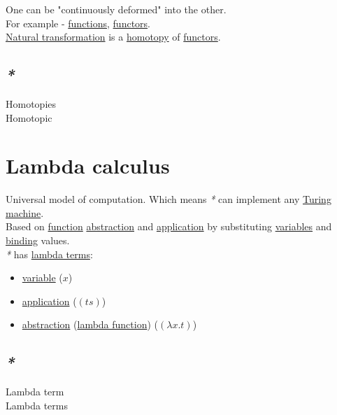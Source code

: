 \documentclass[a4paper,14pt,oneside]{book}
\begin{document}
One can be "continuously deformed" into the other.\\

For example - \hyperref[org97ed87c]{functions}, \hyperref[orgf720a64]{functors}.\\
\hyperref[orgffb05cd]{Natural transformation} is a \hyperref[org659b053]{homotopy} of \hyperref[orgf720a64]{functors}.\\

\section{\emph{*}}
\label{sec:orgce8bfd5}

\label{org361b29b}Homotopies\\
\label{org7de23b7}Homotopic\\

\chapter{\label{org0ae4556}Lambda calculus}
\label{sec:orge9ca0ed}
Universal model of computation. Which means \emph{*} can implement any \hyperref[orgb4fe13e]{Turing machine}.\\
Based on \hyperref[org3b87f30]{function} \hyperref[orgc8d403a]{abstraction} and \hyperref[org47dbb80]{application} by substituting \hyperref[org4d14573]{variables} and \hyperref[org2f43034]{binding} values.\\

\emph{*} has \hyperref[org16a0e0e]{lambda terms}:\\
\begin{itemize}
\item \hyperref[orgd7c7b78]{variable} (\(x\))\\
\item \hyperref[org47dbb80]{application} (\((ts)\))\\
\item \hyperref[orgc8d403a]{abstraction} (\hyperref[org666999c]{lambda function}) (\((\lambda x . t)\))\\
\end{itemize}

\section{\emph{*}}
\label{sec:org7196784}

\label{org997d09a}Lambda term\\
\label{org16a0e0e}Lambda terms\\
\end{document}
